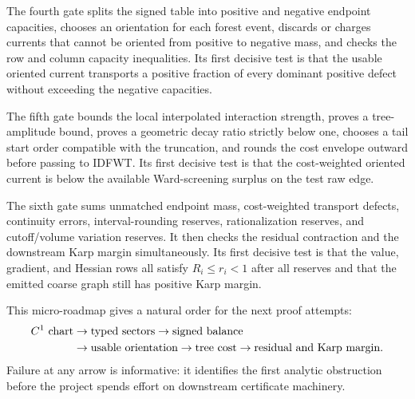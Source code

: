 The fourth gate splits the signed table into positive and negative endpoint
capacities, chooses an orientation for each forest event, discards or charges
currents that cannot be oriented from positive to negative mass, and checks
the row and column capacity inequalities.  Its first decisive test is that the
usable oriented current transports a positive fraction of every dominant
positive defect without exceeding the negative capacities.

The fifth gate bounds the local interpolated interaction strength, proves a
tree-amplitude bound, proves a geometric decay ratio strictly below one,
chooses a tail start order compatible with the truncation, and rounds the cost
envelope outward before passing to IDFWT.  Its first decisive test is that the
cost-weighted oriented current is below the available Ward-screening surplus
on the test raw edge.

The sixth gate sums unmatched endpoint mass, cost-weighted transport defects,
continuity errors, interval-rounding reserves, rationalization reserves, and
cutoff/volume variation reserves.  It then checks the residual contraction and
the downstream Karp margin simultaneously.  Its first decisive test is that
the value, gradient, and Hessian rows all satisfy \(R_i\le r_i<1\) after all
reserves and that the emitted coarse graph still has positive Karp margin.

This micro-roadmap gives a natural order for the next proof attempts:
\begin{align*}
  C^1\hbox{ chart}
  &\to \hbox{typed sectors}
  \to \hbox{signed balance}\\
  &\to \hbox{usable orientation}
  \to \hbox{tree cost}
  \to \hbox{residual and Karp margin}.
\end{align*}
Failure at any arrow is informative: it identifies the first analytic
obstruction before the project spends effort on downstream certificate
machinery.

